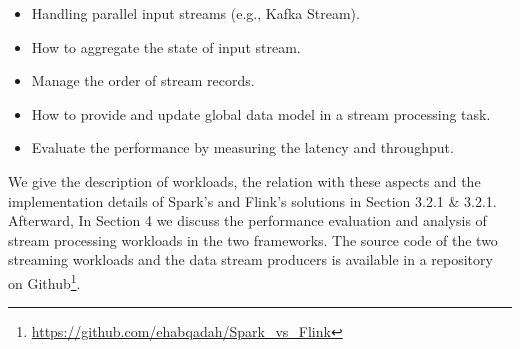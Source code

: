 \documentclass[]{article}
\begin{document}
\begin{itemize}
\item Handling parallel input streams (e.g., Kafka Stream).
\item How to aggregate the state of input stream.
\item Manage the order of stream records.
\item How to provide and update global data model in a stream processing task.
\item Evaluate the performance by measuring the latency and throughput.
\end{itemize}
We give the description of workloads, the relation with these aspects and  the implementation details of Spark's and Flink's solutions in Section 3.2.1 \& 3.2.1. Afterward, In Section 4 we discuss the performance evaluation and analysis of stream processing workloads in the two frameworks. 
The source code of the two streaming workloads and the data stream producers is available in a repository on Github\footnote{\url{https://github.com/ehabqadah/Spark_vs_Flink}}. 
\end{document}
